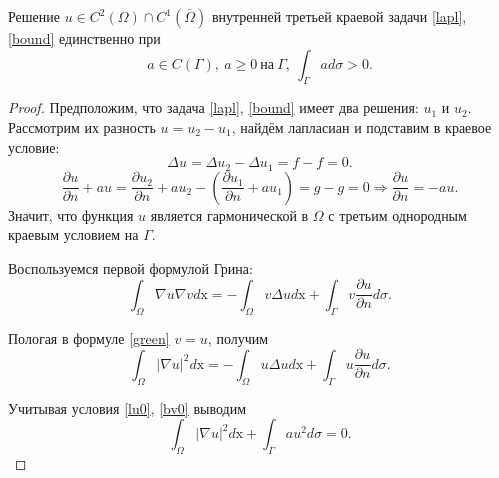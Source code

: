     \begin{theorem}
        Решение \( u \in C^2 (\Omega) \cap C^1(\overline{\Omega}) \) внутренней третьей краевой задачи \eqref{lapl}, \eqref{bound} единственно при
        \begin{equation} \tag{$i$}
            a \in C(\Gamma), ~ a \geq 0 ~ \text{на} ~ \Gamma, ~ \int_\Gamma a d\sigma > 0. \label{i}
        \end{equation}
    \end{theorem}

    \begin{proof}
        Предположим, что задача \eqref{lapl}, \eqref{bound} имеет два решения: \(u_1\) и \(u_2\). Рассмотрим их разность \( u = u_2 - u_1 \), найдём лапласиан и подставим в краевое условие:
        \begin{equation*}
            \Delta u = \Delta u_2 - \Delta u_1 = f - f = 0. \tag{$j$} \label{lu0}
        \end{equation*}
        \begin{equation*}
            \frac{\partial u}{\partial n} + au = \frac{\partial u_2}{\partial n} + au_2 - \left( \frac{\partial u_1}{\partial n} + au_1 \right) = g - g = 0 \Rightarrow \frac{\partial u}{\partial n} = -au. \tag{$jj$} \label{bv0}
        \end{equation*}
        Значит, что функция \( u \) является гармонической в \(\Omega\) с третьим однородным краевым условием на \( \Gamma \).
        
        Воспользуемся первой формулой Грина:
        \begin{equation}
            \int_\Omega \nabla u \nabla v d\mathrm{x} = -\int_\Omega v \Delta u d\mathrm{x} + \int_\Gamma v \frac{\partial u}{\partial n} d\sigma. \label{green}
        \end{equation}

        Пологая в формуле \eqref{green} \( v = u \), получим
        \begin{equation}
            \int_\Omega | \nabla u |^2 d\mathrm{x} = -\int_\Omega u \Delta u d\mathrm{x} + \int_\Gamma u \frac{\partial u}{\partial n} d\sigma. \label{green_uu}
        \end{equation}
        
        Учитывая условия \eqref{lu0}, \eqref{bv0} выводим
        \begin{equation}
            \int_\Omega | \nabla u |^2 d\mathrm{x} + \int_\Gamma a u^2 d\sigma = 0. \label{green_sub}
        \end{equation}
        

\end{proof}
